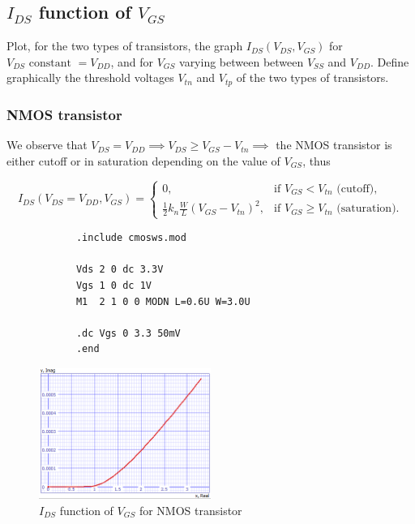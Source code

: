 \documentclass[../main.tex]{subfiles}
\begin{document}
	\subsection{$I_{DS}$ function of $V_{GS}$}
	{
		
		\begin{tcolorbox}[colback=gray!5!white,colframe=gray!75!black]
			Plot, for the two types of transistors, the graph $I_{DS}(V_{DS}, V_{GS})$ for $V_{DS} \text{ constant } = V_{DD}$, and for $V_{GS}$ varying between between $V_{SS}$ and $V_{DD}$. Define graphically the threshold voltages $V_{tn}$ and $V_{tp}$ of the two types of transistors.
		\end{tcolorbox}
		
		\subsubsection{NMOS transistor}
		{
			
		We observe that $V_{DS} = V_{DD} \implies V_{DS} \geq V_{GS} - V_{tn} \implies$ the NMOS transistor is either cutoff or in saturation depending on the value of $V_{GS}$, thus
		
		\begin{equation}
			I_{DS}(V_{DS} = V_{DD}, V_{GS}) = 
			\begin{cases} 
				0, & \text{if } V_{GS} < V_{tn} \text{ (cutoff)}, \\[5pt]
				\frac{1}{2} k_n \frac{W}{L} (V_{GS} - V_{tn})^2, & \text{if } V_{GS} \geq V_{tn} \text{ (saturation)}.
			\end{cases}
		\end{equation}
		
		\begin{lstlisting}
			.include cmosws.mod
			
			Vds 2 0 dc 3.3V
			Vgs 1 0 dc 1V
			M1  2 1 0 0 MODN L=0.6U W=3.0U
			
			.dc Vgs 0 3.3 50mV
			.end
		\end{lstlisting}
		
		\begin{figure}[H]
			\centering
			\includegraphics[width=0.5\textwidth]{plots/Q1_nmos.png}
			\caption{$I_{DS}$ function of $V_{GS}$ for NMOS transistor}
		\end{figure}
		
}}
\end{document}
